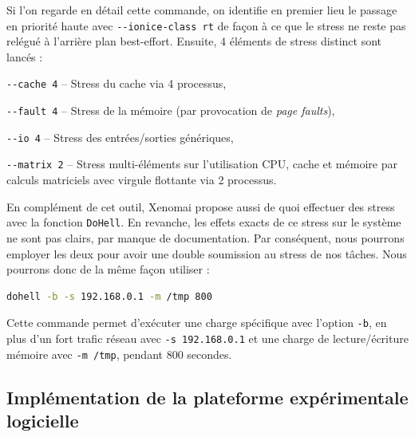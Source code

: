 \documentclass[french, a4paper, 11pt, twoside, pdftex]{StyleThese}
\begin{document}
	Si l'on regarde en détail cette commande, on identifie en premier lieu le passage en priorité haute avec \texttt{-{}-ionice-class rt} de façon à ce que le stress ne reste pas relégué à l'arrière plan best-effort. Ensuite, 4 éléments de stress distinct sont lancés : 
	\begin{description}
		\item \texttt{-{}-cache 4} -- Stress du cache via 4 processus,
		\item \texttt{-{}-fault 4} -- Stress de la mémoire (par provocation de \textit{page faults}),
		\item \texttt{-{}-io 4} -- Stress des entrées/sorties génériques,
		\item \texttt{-{}-matrix 2} -- Stress multi-éléments sur l'utilisation CPU, cache et mémoire par calculs matriciels avec virgule flottante via 2 processus.
	\end{description}

	En complément de cet outil, Xenomai propose aussi de quoi effectuer des stress avec la fonction \texttt{DoHell}. En revanche, les effets exacts de ce stress sur le système ne sont pas clairs, par manque de documentation. Par conséquent, nous pourrons employer les deux pour avoir une double soumission au stress de nos tâches. Nous pourrons donc de la même façon utiliser : 

	\begin{lstlisting}[language=bash, numbers=none]
	dohell -b -s 192.168.0.1 -m /tmp 800\end{lstlisting}
	
	
	Cette commande permet d'exécuter une charge spécifique avec l'option \texttt{-b}, en plus d'un fort trafic réseau avec \texttt{-s 192.168.0.1} et une charge de lecture/écriture mémoire avec \texttt{-m /tmp}, pendant 800 secondes.
        
    \subsection{Implémentation de la plateforme expérimentale logicielle}
    
\end{document}
